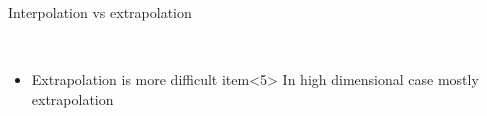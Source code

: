 \documentclass[english,t]{beamer}
\begin{document}
\begin{frame}{Interpolation vs extrapolation}

  \\
  \begin{itemize}
  \item<4> Extrapolation is more difficult
   item<5> In high dimensional case mostly extrapolation
  \end{itemize}
\end{frame}
\end{document}
